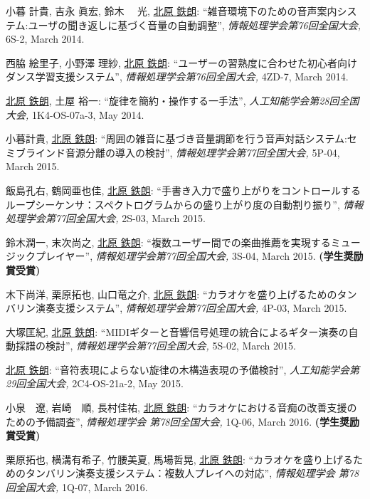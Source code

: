 \begin{Enumerate}
\item 
小暮 計貴, 
吉永 眞宏, 
鈴木 　光, 
\underline{北原 鉄朗}: 
    ``雑音環境下のための音声案内システム:ユーザの聞き返しに基づく音量の自動調整'', 
    {\it 情報処理学会第76回全国大会,
    } 6S-2, March 2014. 

\item 
西脇 絵里子, 
小野澤 理紗, 
\underline{北原 鉄朗}: 
    ``ユーザーの習熟度に合わせた初心者向けダンス学習支援システム'', 
    {\it 情報処理学会第76回全国大会,
    } 4ZD-7, March 2014. 

\item 
\underline{北原 鉄朗}, 
土屋 裕一: 
    ``旋律を簡約・操作する一手法'', 
    {\it 人工知能学会第28回全国大会,
    } 1K4-OS-07a-3, May 2014. 

\item 
小暮計貴, 
\underline{北原 鉄朗}: 
    ``周囲の雑音に基づき音量調節を行う音声対話システム:セミブラインド音源分離の導入の検討'', 
    {\it 情報処理学会第77回全国大会,
    } 5P-04, March 2015. 

\item 
飯島孔右, 
鶴岡亜也佳, 
\underline{北原 鉄朗}: 
    ``手書き入力で盛り上がりをコントロールするループシーケンサ：スペクトログラムからの盛り上がり度の自動割り振り'', 
    {\it 情報処理学会第77回全国大会,
    } 2S-03, March 2015. 

\item 
鈴木潤一, 
末次尚之, 
\underline{北原 鉄朗}: 
    ``複数ユーザー間での楽曲推薦を実現するミュージックプレイヤー'', 
    {\it 情報処理学会第77回全国大会,
    } 3S-04, March 2015. 
{\bf (学生奨励賞受賞)}
\item 
木下尚洋, 
栗原拓也, 
山口竜之介, 
\underline{北原 鉄朗}: 
    ``カラオケを盛り上げるためのタンバリン演奏支援システム'', 
    {\it 情報処理学会第77回全国大会,
    } 4P-03, March 2015. 

\item 
大塚匡紀, 
\underline{北原 鉄朗}: 
    ``MIDIギターと音響信号処理の統合によるギター演奏の自動採譜の検討'', 
    {\it 情報処理学会第77回全国大会,
    } 5S-02, March 2015. 

\item 
\underline{北原 鉄朗}: 
    ``音符表現によらない旋律の木構造表現の予備検討'', 
    {\it 人工知能学会第29回全国大会,
    } 2C4-OS-21a-2, May 2015. 

\item 
小泉　遼, 
岩崎　順, 
長村佳祐, 
\underline{北原 鉄朗}: 
    ``カラオケにおける音痴の改善支援のための予備調査'', 
    {\it 情報処理学会 第78回全国大会,
    } 1Q-06, March 2016. 
{\bf (学生奨励賞受賞)}
\item 
栗原拓也, 
横溝有希子, 
竹腰美夏, 
馬場哲晃, 
\underline{北原 鉄朗}: 
    ``カラオケを盛り上げるためのタンバリン演奏支援システム：複数人プレイへの対応'', 
    {\it 情報処理学会 第78回全国大会,
    } 1Q-07, March 2016. 


\end{Enumerate}
